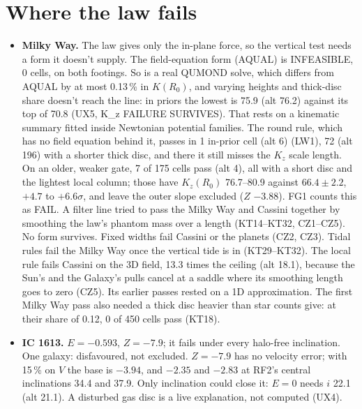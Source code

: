\documentclass[10pt]{article}
\begin{document}
\section{Where the law fails}\label{sec:fails}
\begin{itemize}
\item \textbf{Milky Way.} The law gives only the in-plane force, so the vertical test needs a form it doesn't supply. The field-equation form (AQUAL) is INFEASIBLE, 0 cells, on both footings. So is a real QUMOND solve, which differs from AQUAL by at most 0.13\,\% in $K(R_0)$, and varying heights and thick-disc share doesn't reach the line: in priors the lowest is 75.9 (alt 76.2) against its top of 70.8 (UX5, K\_z FAILURE SURVIVES). That rests on a kinematic summary fitted inside Newtonian potential families. The round rule, which has no field equation behind it, passes in 1 in-prior cell (alt 6) (LW1), 72 (alt 196) with a shorter thick disc, and there it still misses the $K_z$ scale length. On an older, weaker gate, 7 of 175 cells pass (alt 4), all with a short disc and the lightest local column; those have $K_z(R_0)$ 76.7--80.9 against $66.4\pm2.2$, $+4.7$ to $+6.6\sigma$, and leave the outer slope excluded ($Z$ $-3.88$). FG1 counts this as FAIL. A filter line tried to pass the Milky Way and Cassini together by smoothing the law's phantom mass over a length (KT14--KT32, CZ1--CZ5). No form survives. Fixed widths fail Cassini or the planets (CZ2, CZ3). Tidal rules fail the Milky Way once the vertical tide is in (KT29--KT32). The local rule fails Cassini on the 3D field, 13.3 times the ceiling (alt 18.1), because the Sun's and the Galaxy's pulls cancel at a saddle where its smoothing length goes to zero (CZ5). Its earlier passes rested on a 1D approximation. The first Milky Way pass also needed a thick disc heavier than star counts give: at their share of 0.12, 0 of 450 cells pass (KT18).
\item \textbf{IC 1613.} $E=-0.593$, $Z=-7.9$; it fails under every halo-free inclination. One galaxy: disfavoured, not excluded. $Z=-7.9$ has no velocity error; with 15\,\% on $V$ the base is $-3.94$, and $-2.35$ and $-2.83$ at RF2's central inclinations 34.4 and 37.9. Only inclination could close it: $E=0$ needs $i$ 22.1 (alt 21.1). A disturbed gas disc is a live explanation, not computed (UX4).

\end{itemize}
\end{document}

